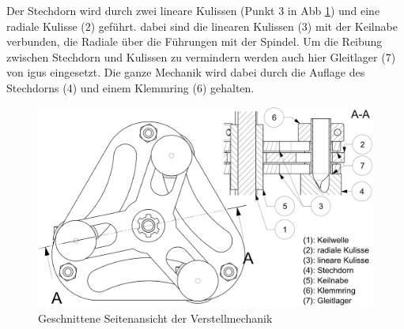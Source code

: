 Der Stechdorn wird durch zwei lineare Kulissen (Punkt 3 in Abb \ref{fig:schnitt_vm}) und eine radiale Kulisse (2) geführt. dabei sind die linearen Kulissen (3) mit der Keilnabe verbunden, die Radiale über die Führungen mit der Spindel. Um die Reibung zwischen Stechdorn und Kulissen zu vermindern werden auch hier Gleitlager (7) von igus eingesetzt. Die ganze Mechanik wird dabei durch die Auflage des Stechdorns (4) und einem Klemmring (6) gehalten.
	\begin{figure}[H]
	\includegraphics[scale=0.63]{Illustrationen/6-Umsetzung/schnitt_vm.jpg}
	\caption{Geschnittene Seitenansicht der Verstellmechanik}
	\label{fig:schnitt_vm}
	\end{figure}

